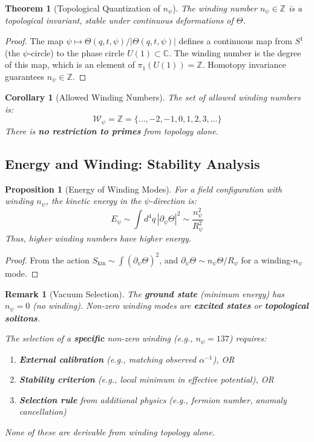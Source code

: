\documentclass[12pt]{article}
\newtheorem{theorem}[definition]{Theorem}
\newtheorem{proposition}[definition]{Proposition}
\newtheorem{remark}[definition]{Remark}
\newtheorem{corollary}[definition]{Corollary}
\newcommand{\C}{\mathbb{C}}
\newcommand{\Z}{\mathbb{Z}}
\begin{document}
\begin{theorem}[Topological Quantization of $n_\psi$]
\label{thm:winding_quantization}
The winding number $n_\psi \in \Z$ is a topological invariant, stable under continuous deformations of $\Theta$.
\end{theorem}

\begin{proof}
The map $\psi \mapsto \Theta(q, t, \psi)/|\Theta(q, t, \psi)|$ defines a continuous map from $S^1$ (the $\psi$-circle) to the phase circle $U(1) \subset \C$. The winding number is the degree of this map, which is an element of $\pi_1(U(1)) = \Z$. Homotopy invariance guarantees $n_\psi \in \Z$.
\end{proof}

\begin{corollary}[Allowed Winding Numbers]
The set of allowed winding numbers is:
\begin{equation}
\mathcal{W}_\psi = \Z = \{\ldots, -2, -1, 0, 1, 2, 3, \ldots\}
\end{equation}
There is \textbf{no restriction to primes} from topology alone.
\end{corollary}

\subsection{Energy and Winding: Stability Analysis}

\begin{proposition}[Energy of Winding Modes]
For a field configuration with winding $n_\psi$, the kinetic energy in the $\psi$-direction is:
\begin{equation}
E_{\psi} \sim \int d^4q \, |\partial_\psi \Theta|^2 \sim \frac{n_\psi^2}{R_\psi^2}
\end{equation}
Thus, higher winding numbers have higher energy.
\end{proposition}

\begin{proof}
From the action $S_{\text{kin}} \sim \int (\partial_\psi \Theta)^2$, and $\partial_\psi \Theta \sim n_\psi \Theta / R_\psi$ for a winding-$n_\psi$ mode.
\end{proof}

\begin{remark}[Vacuum Selection]
The \textbf{ground state} (minimum energy) has $n_\psi = 0$ (no winding). Non-zero winding modes are \textbf{excited states} or \textbf{topological solitons}. 

The selection of a \textbf{specific} non-zero winding (e.g., $n_\psi = 137$) requires:
\begin{enumerate}
    \item \textbf{External calibration} (e.g., matching observed $\alpha^{-1}$), OR
    \item \textbf{Stability criterion} (e.g., local minimum in effective potential), OR
    \item \textbf{Selection rule} from additional physics (e.g., fermion number, anomaly cancellation)
\end{enumerate}
None of these are derivable from winding topology alone.
\end{remark}
\end{document}
